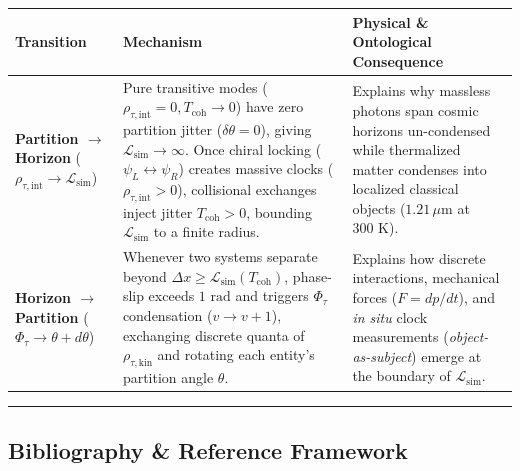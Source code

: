 \documentclass[
]{article}
\newcounter{none} %
\begin{document}
{\def\LTcaptype{none} %
\begin{longtable}[]{@{}
  >{\raggedright\arraybackslash}p{}
  >{\raggedright\arraybackslash}p{}
  >{\raggedright\arraybackslash}p{}@{}}
\toprule\noalign{}
\begin{minipage}[b]{\linewidth}\raggedright
Transition
\end{minipage} & \begin{minipage}[b]{\linewidth}\raggedright
Mechanism
\end{minipage} & \begin{minipage}[b]{\linewidth}\raggedright
Physical \& Ontological Consequence
\end{minipage} \\
\midrule\noalign{}
\endhead
\bottomrule\noalign{}
\endlastfoot
\textbf{Partition \(\to\) Horizon}
(\(\rho_{\tau,\text{int}} \to \mathcal{L}_{\text{sim}}\)) & Pure
transitive modes (\(\rho_{\tau,\text{int}} = 0, T_{\text{coh}} \to 0\))
have zero partition jitter (\(\delta\theta = 0\)), giving
\(\mathcal{L}_{\text{sim}} \to \infty\). Once chiral locking
(\(\psi_L \leftrightarrow \psi_R\)) creates massive clocks
(\(\rho_{\tau,\text{int}} > 0\)), collisional exchanges inject jitter
\(T_{\text{coh}} > 0\), bounding \(\mathcal{L}_{\text{sim}}\) to a
finite radius. & Explains why massless photons span cosmic horizons
un-condensed while thermalized matter condenses into localized classical
objects (\(1.21\,\mu\text{m}\) at \(300\text{ K}\)). \\
\textbf{Horizon \(\to\) Partition} (\(\Phi_\tau \to \theta + d\theta\))
& Whenever two systems separate beyond
\(\Delta x \ge \mathcal{L}_{\text{sim}}(T_{\text{coh}})\), phase-slip
exceeds \(1\text{ rad}\) and triggers \(\Phi_\tau\) condensation
(\(v \to v + 1\)), exchanging discrete quanta of
\(\rho_{\tau,\text{kin}}\) and rotating each entity's partition angle
\(\theta\). & Explains how discrete interactions, mechanical forces
(\(F = dp/dt\)), and \emph{in situ} clock measurements
(\emph{object-as-subject}) emerge at the boundary of
\(\mathcal{L}_{\text{sim}}\). \\
\end{longtable}
}

\begin{center}\rule{0.5\linewidth}{0.5pt}\end{center}

\subsection{Bibliography \& Reference
Framework}\label{bibliography-reference-framework}
\end{document}

